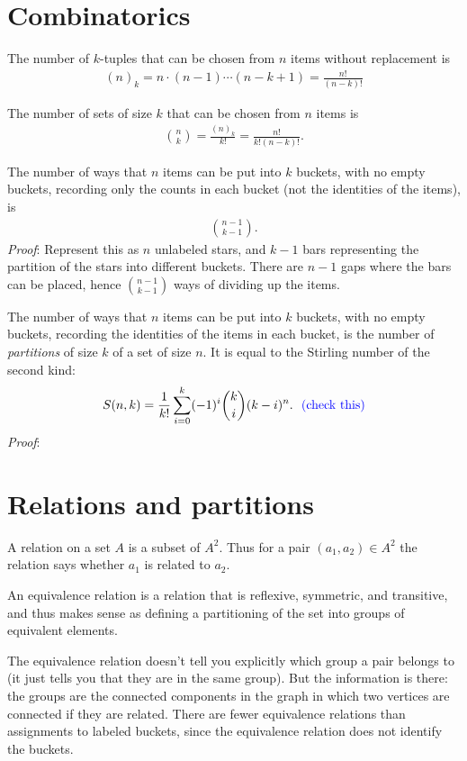 \section{Combinatorics}
The number of $k$-tuples that can be chosen from $n$ items without
replacement is
\begin{align*}
  (n)_k = n \cdot (n-1) \cdots (n - k + 1) = \frac{n!}{(n-k)!}
\end{align*}

The number of sets of size $k$ that can be chosen from $n$ items is
\begin{align*}
  {n \choose k} = \frac{(n)_k}{k!} = \frac{n!}{k!(n-k)!}.
\end{align*}

The number of ways that $n$ items can be put into $k$ buckets, with no empty
buckets, recording only the counts in each bucket (not the identities of the
items), is
\begin{align*}
  {n-1 \choose k -1}.
\end{align*}
\textit{Proof}: Represent this as $n$ unlabeled stars, and $k-1$ bars
representing the partition of the stars into different buckets. There are $n-1$
gaps where the bars can be placed, hence ${n-1 \choose k -1}$ ways of dividing
up the items.

The number of ways that $n$ items can be put into $k$ buckets, with no empty
buckets, recording the identities of the items in each bucket, is the number of
\textit{partitions} of size $k$ of a set of size $n$. It is equal to the
Stirling number of the second kind:
\begin{align*}
  S(n, k) = \frac{1}{k!} \sum_{i=0}^k(-1)^i{k \choose i}(k-i)^n. ~~ \textcolor{blue}{\text{(check this)}}
\end{align*}
\textit{Proof}:

\section{Relations and partitions}
A relation on a set $A$ is a subset of $A^2$. Thus for a pair
$(a_1, a_2) \in A^2$ the relation says whether $a_1$ is related to $a_2$.

An equivalence relation is a relation that is reflexive, symmetric, and
transitive, and thus makes sense as defining a partitioning of the set into
groups of equivalent elements.

The equivalence relation doesn't tell you explicitly which group a pair belongs
to (it just tells you that they are in the same group). But the information is
there: the groups are the connected components in the graph in which two
vertices are connected if they are related. There are fewer equivalence
relations than assignments to labeled buckets, since the equivalence relation
does not identify the buckets. 
